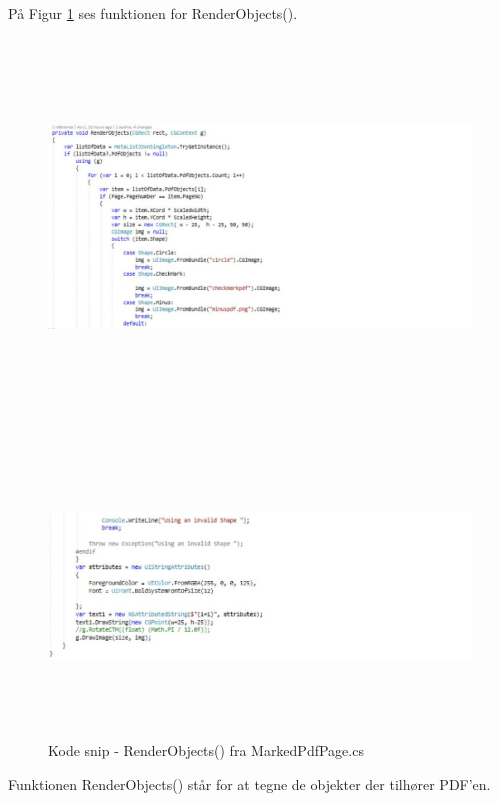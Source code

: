 På Figur \ref{fig:Render} ses funktionen for RenderObjects().
\begin{figure}[H] %
	\centering
	\includegraphics[height=10cm, width=15cm]{../ArkitekturDesign/Design/RegisterPDF/Render1}
\end{figure}
\begin{figure}[H] %
	\centering
	\includegraphics[height=8cm, width=15cm]{../ArkitekturDesign/Design/RegisterPDF/Render2}
	\caption{Kode snip - RenderObjects() fra MarkedPdfPage.cs}
	\label{fig:Render}
\end{figure}
Funktionen RenderObjects() står for at tegne de objekter der tilhører PDF'en.

\clearpage

